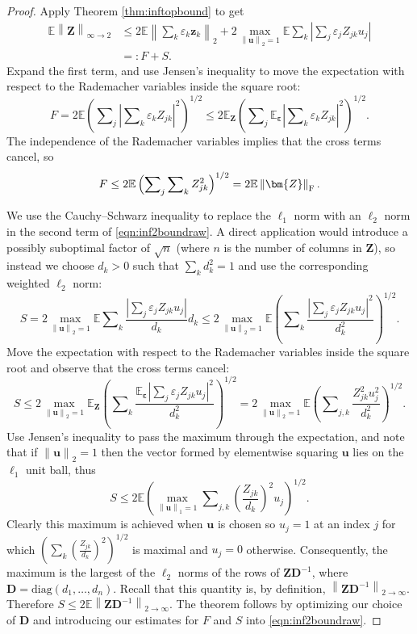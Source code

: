 \documentclass[11pt,letterpaper,twoside,reqno]{amsart}
\newcommand{\mat}[1]{\ensuremath{\bm{#1}}}
\newcommand{\E}{\ensuremath{\mathbb{E}}}
\newcommand{\supovertball}{\ensuremath{\max_{\norm{\mat{u}}_2 = 1}}}
\newcommand{\norm}[1]{\ensuremath{\left\|#1\right\|}}
\newcommand{\twoinfnorm}[1]{\ensuremath{\left\|#1\right\|_{2 \rightarrow \infty}}}
\newcommand{\frobnorm}[1]{\ensuremath{\left\|#1\right\|_{\text{\rm F}}}}
\newcommand{\eqqcolon}{=\mathrel{\mathop:}} %
\begin{document}
\begin{proof}
Apply Theorem \ref{thm:inftopbound} to get 
\begin{equation}
\begin{aligned}
\E\norm{\mat{Z}}_{\infty\rightarrow2} & \leq2\E\norm{\sum\nolimits_{k}\varepsilon_{k}\mat{z}_{k}}_{2}+2\supovertball\E\sum\nolimits_{k}\left|\sum\nolimits_{j}\varepsilon_{j}Z_{jk}u_{j}\right| \\
	& \eqqcolon F + S.
\end{aligned}
\label{eqn:inf2boundraw}
\end{equation}
Expand the first term, and use Jensen's inequality to move the expectation with respect to the Rademacher variables inside the square root: 
\[
F = 2\E\left(\sum\nolimits_{j}\left|\sum\nolimits_{k}\varepsilon_{k}Z_{jk}\right|^{2}\right)^{1/2}\leq2\E_{\mat{Z}}\left(\sum\nolimits_{j}\E_{\boldsymbol{\varepsilon}}\left|\sum\nolimits_{k}\varepsilon_{k}Z_{jk}\right|^{2}\right)^{1/2}.
\]
The independence of the Rademacher variables implies that the cross terms cancel, so 
\[
F \leq2\E\left(\sum\nolimits_{j}\sum\nolimits_{k}Z_{jk}^{2}\right)^{1/2}=2\E\frobnorm{\mat{Z}}.
\]

We use the Cauchy--Schwarz inequality to replace the $\ell_{1}$ norm with an $\ell_{2}$ norm in the second term of \eqref{eqn:inf2boundraw}. A direct application would introduce a possibly suboptimal factor of $\sqrt{n}$ (where $n$ is the number of columns in $\mat{Z}$), so instead we choose $d_{k}>0$ such that $\sum_{k}d_{k}^{2}=1$ and use the corresponding weighted $\ell_{2}$ norm: 
\[
S = 2\supovertball\E\sum\nolimits_{k}\frac{\left|\sum\nolimits_{j}\varepsilon_{j}Z_{jk}u_{j}\right|}{d_{k}}d_{k}\leq2\supovertball\E\left(\sum\nolimits_{k}\frac{\left|\sum\nolimits_{j}\varepsilon_{j}Z_{jk}u_{j}\right|^{2}}{d_{k}^{2}}\right)^{1/2}.
\]
Move the expectation with respect to the Rademacher variables inside the square root and observe that the cross terms cancel:
\[
S\leq2\supovertball\E_{\mat{Z}}\left(\sum\nolimits_{k}\frac{\E_{\boldsymbol{\varepsilon}}\left|\sum\nolimits_{j}\varepsilon_{j}Z_{jk}u_{j}\right|^{2}}{d_{k}^{2}}\right)^{1/2}=2\supovertball\E\left(\sum\nolimits_{j,k}\frac{Z_{jk}^{2}u_{j}^{2}}{d_{k}^{2}}\right)^{1/2}.
\]
Use Jensen's inequality to pass the maximum through the expectation, and note that if $\norm{\mat{u}}_{2}=1$ then the vector formed by elementwise squaring $\mat{u}$ lies on the $\ell_{1}$ unit ball, thus 
\[
S \leq2\E\left(\max_{\norm{\mat{u}}_{1}=1}\sum\nolimits_{j,k}\left(\frac{Z_{jk}}{d_{k}}\right)^{2}u_{j}\right)^{1/2}.
\]
Clearly this maximum is achieved when $\mat{u}$ is chosen so $u_{j}=1$ at an index $j$ for which $\left(\sum\nolimits_{k}\left(\frac{Z_{jk}}{d_{k}}\right)^{2}\right)^{1/2}$ is maximal and $u_{j}=0$ otherwise. Consequently, the maximum is the largest of the $\ell_{2}$ norms of the rows of $\mat{Z}\mat{D}^{-1}$, where $\mat{D}=\text{diag}(d_{1},\ldots,d_{n})$. Recall that this quantity is, by definition, $\twoinfnorm{\mat{Z}\mat{D}^{-1}}.$ Therefore $S \leq2\E\twoinfnorm{\mat{Z}\mat{D}^{-1}}$. The theorem follows by optimizing our choice of $\mat{D}$ and introducing our estimates for $F$ and $S$ into \eqref{eqn:inf2boundraw}. 
\end{proof}
\end{document}

